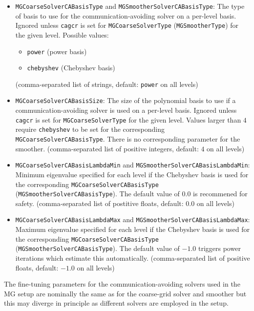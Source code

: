 \begin{itemize}
  \item{ \texttt{MGCoarseSolverCABasisType} and \texttt{MGSmootherSolverCABasisType}: The type of basis to use for the communication-avoiding solver on a per-level basis. Ignored unless \texttt{cagcr} is set for \texttt{MGCoarseSolverType} (\texttt{MGSmootherType}) for the given level. Possible values:
  \begin{itemize}
    \item \texttt{power} (power basis)
    \item \texttt{chebyshev} (Chebyshev basis)
  \end{itemize}
    (comma-separated list of strings, default: \texttt{power} on all levels)}
  \item{ \texttt{MGCoarseSolverCABasisSize}: The size of the polynomial basis to use if a communication-avoiding solver is used on a per-level basis. Ignored unless \texttt{cagcr} is set for \texttt{MGCoarseSolverType} for the given level. Values larger than $4$ require \texttt{chebyshev} to be set for the corresponding \texttt{MGCoarseSolverCABasisType}. There is no corresponding parameter for the smoother. (comma-separated list of positive integers, default: $4$ on all levels)}
  \item{ \texttt{MGCoarseSolverCABasisLambdaMin} and \texttt{MGSmootherSolverCABasisLambdaMin}: Minimum eigenvalue specified for each level if the Chebyshev basis is used for the corresponding \texttt{MGCoarseSolverCABasisType} (\texttt{MGSmootherSolverCABasisType}). The default value of $0.0$ is recommened for safety. (comma-separated list of postitive floats, default: $0.0$ on all levels)}
  \item{ \texttt{MGCoarseSolverCABasisLambdaMax} and \texttt{MGSmootherSolverCABasisLambdaMax}: Maximum eigenvalue specified for each level if the Chebyshev basis is used for the corresponding \texttt{MGCoarseSolverCABasisType} (\texttt{MGSmootherSolverCABasisType}). The default value of $-1.0$ triggers power iterations which estimate this automatically. (comma-separated list of positive floats, default: $-1.0$ on all levels)}
\end{itemize}
The fine-tuning parameters for the communication-avoiding solvers used in the MG setup are nominally the same as for the coarse-grid solver and smoother but this may diverge in principle as different solvers are employed in the setup.
